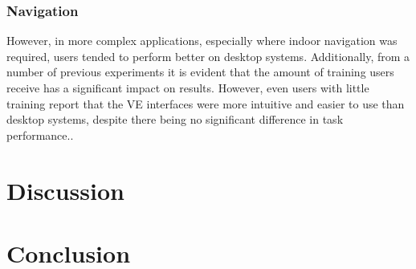 \documentclass{sig-alternate-05-2015}
\begin{document}
\subsubsection{Navigation}
However, in more complex applications, especially where indoor navigation was required, users tended to perform better on desktop systems\cite{SousaSantos2009}. Additionally, from a number of previous experiments it is evident that the amount of training users receive has a significant impact on results. However, even users with little training report that the VE interfaces were more intuitive and easier to use than desktop systems, despite there being no significant difference in task performance.\cite{Toma2012}.
\section{Discussion}
\section{Conclusion}


\end{document}

